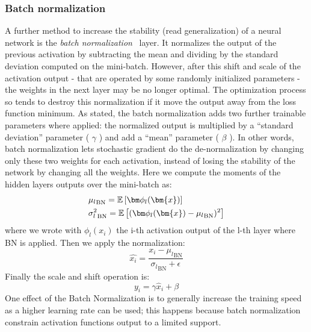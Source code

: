 \subsubsection{Batch normalization}
A further method to increase the stability (read generalization) of a neural network is the \textit{batch normalization}~\cite{ioffe2015batch} layer. It normalizes the output of the previous activation by subtracting the mean and dividing by the standard deviation computed on the mini-batch.
However, after this shift and scale of the activation output - that are operated by some randomly initialized parameters - the weights in the next layer may be no longer optimal. The optimization process so tends to destroy this normalization if it move the output away from the loss function minimum.
As stated, the batch normalization adds two further trainable parameters where applied: the normalized output is multiplied by a “standard deviation” parameter ( $\gamma$ ) and add a “mean” parameter ( $\beta$ ). In other words, batch normalization lets stochastic gradient do the de-normalization by changing only these two weights for each activation, instead of losing the stability of the network by changing all the weights.
Here we compute the moments of the hidden layers outputs over the mini-batch as:
\begin{align*}
    & {\mu_l}_{\text{BN}} = \expectation{\bm\phi_l(\bm{x})} \\
    & {\sigma^2_l}_{\text{BN}} = \expectation{ (\bm\phi_l(\bm{x}) - {\mu_l}_{\text{BN}})^2 }
\end{align*}
where we wrote with $\phi_l(x_i)$ the i-th activation output of the l-th layer where BN is applied.
Then we apply the normalization:
\begin{equation}
    \hat{x_i} = \frac{x_i - {\mu_l}_{\text{BN}}}{ {\sigma_l}_{\text{BN}} + \epsilon }
\end{equation}
Finally the scale and shift operation is:
\begin{equation}
    y_i = \gamma \hat x_i + \beta
\end{equation}
One effect of the Batch Normalization is to generally increase the training speed as a higher learning rate can be used; this happens because batch normalization constrain activation functions output to a limited support. 

